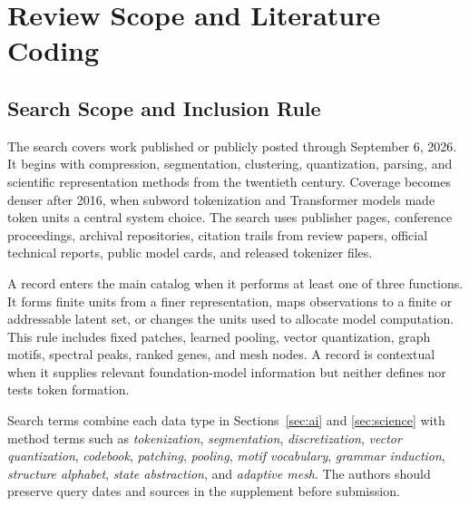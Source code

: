 \section{Review Scope and Literature Coding}
\label{sec:review-protocol}


\subsection{Search Scope and Inclusion Rule}


The search covers work published or publicly posted through September 6, 2026. It begins with compression, segmentation, clustering, quantization, parsing, and scientific representation methods from the twentieth century. Coverage becomes denser after 2016, when subword tokenization and Transformer models made token units a central system choice. The search uses publisher pages, conference proceedings, archival repositories, citation trails from review papers, official technical reports, public model cards, and released tokenizer files.

A record enters the main catalog when it performs at least one of three functions. It forms finite units from a finer representation, maps observations to a finite or addressable latent set, or changes the units used to allocate model computation. This rule includes fixed patches, learned pooling, vector quantization, graph motifs, spectral peaks, ranked genes, and mesh nodes. A record is contextual when it supplies relevant foundation-model information but neither defines nor tests token formation.

Search terms combine each data type in Sections~\ref{sec:ai} and \ref{sec:science} with method terms such as \emph{tokenization}, \emph{segmentation}, \emph{discretization}, \emph{vector quantization}, \emph{codebook}, \emph{patching}, \emph{pooling}, \emph{motif vocabulary}, \emph{grammar induction}, \emph{structure alphabet}, \emph{state abstraction}, and \emph{adaptive mesh}. The authors should preserve query dates and sources in the supplement before submission.

